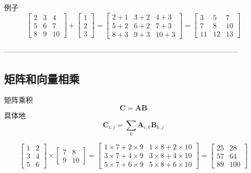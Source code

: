 \documentclass{article}
\begin{document}
例子
\[
\begin{bmatrix}
2 & 3 & 4 \\
5 & 6 & 7 \\
8 & 9 & 10
\end{bmatrix}
+
\begin{bmatrix}
1 \\
2 \\
3
\end{bmatrix}
=
\begin{bmatrix}
2+1 & 3+2 & 4+3 \\
5+2 & 6+2 & 7+3 \\
8+3 & 9+3 & 10+3
\end{bmatrix}
=
\begin{bmatrix}
3 & 5 & 7 \\
7 & 8 & 10 \\
11 & 12 & 13
\end{bmatrix}
\]

--------------------------------------------------------------------------------------------------

\subsection{矩阵和向量相乘}
矩阵乘积
\begin{equation}
    \boldsymbol{C}=\boldsymbol{A}\boldsymbol{B}
\end{equation}
具体地
\begin{equation}
    \mathbf{C}_{i,j}=\sum_{k}\mathbf{A}_{i,k}\mathbf{B}_{k,j}
\end{equation}

\[
\begin{bmatrix}
1 & 2 \\
3 & 4 \\
5 & 6
\end{bmatrix}
\times
\begin{bmatrix}
7 & 8 \\
9 & 10
\end{bmatrix}
=
\begin{bmatrix}
1 \times 7 + 2 \times 9 & 1 \times 8 + 2 \times 10 \\
3 \times 7 + 4 \times 9 & 3 \times 8 + 4 \times 10 \\
5 \times 7 + 6 \times 9 & 5 \times 8 + 6 \times 10
\end{bmatrix}
=
\begin{bmatrix}
25 & 28 \\
57 & 64 \\
89 & 100
\end{bmatrix}
\]
\end{document}
